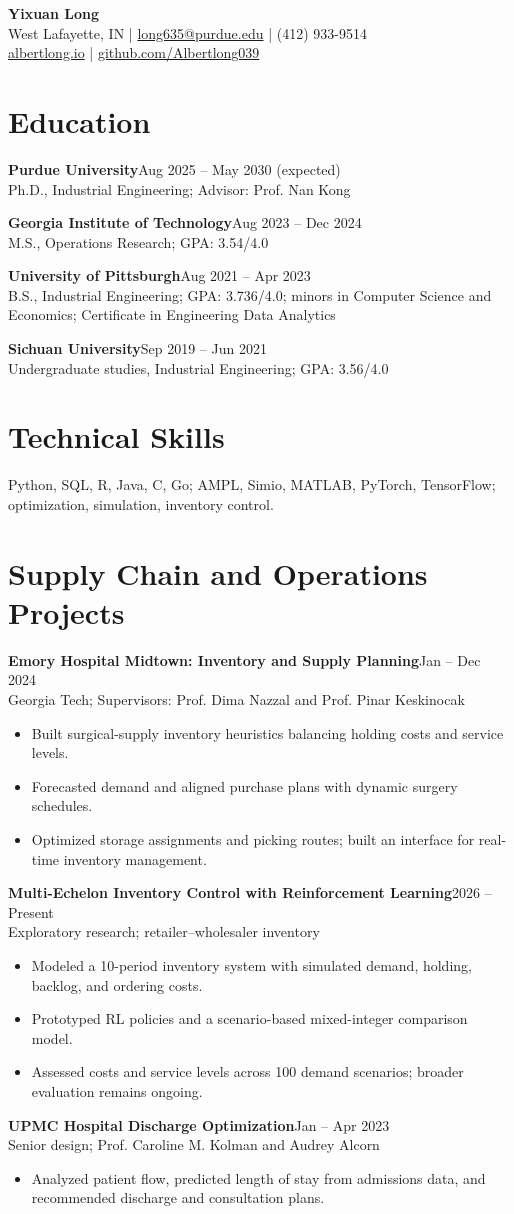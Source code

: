 \documentclass[letterpaper,10pt]{article}
\newcommand{\job}[3]{\textbf{#1}\hfill #2\\{\small #3}\par}
\begin{document}
\begin{center}
{\LARGE\bfseries Yixuan Long}\\
West Lafayette, IN \quad | \quad \href{mailto:long635@purdue.edu}{long635@purdue.edu} \quad | \quad (412) 933-9514\\
\href{https://albertlong.io}{albertlong.io} \quad | \quad \href{https://github.com/Albertlong039}{github.com/Albertlong039}
\end{center}
\section{Education}
\job{Purdue University}{Aug 2025 -- May 2030 (expected)}{Ph.D., Industrial Engineering; Advisor: Prof. Nan Kong}
\job{Georgia Institute of Technology}{Aug 2023 -- Dec 2024}{M.S., Operations Research; GPA: 3.54/4.0}
\job{University of Pittsburgh}{Aug 2021 -- Apr 2023}{B.S., Industrial Engineering; GPA: 3.736/4.0; minors in Computer Science and Economics; Certificate in Engineering Data Analytics}
\job{Sichuan University}{Sep 2019 -- Jun 2021}{Undergraduate studies, Industrial Engineering; GPA: 3.56/4.0}
\section{Technical Skills}
Python, SQL, R, Java, C, Go; AMPL, Simio, MATLAB, PyTorch, TensorFlow; optimization, simulation, inventory control.
\section{Supply Chain and Operations Projects}
\job{Emory Hospital Midtown: Inventory and Supply Planning}{Jan -- Dec 2024}{Georgia Tech; Supervisors: Prof. Dima Nazzal and Prof. Pinar Keskinocak}
\begin{itemize}
\item Built surgical-supply inventory heuristics balancing holding costs and service levels.
\item Forecasted demand and aligned purchase plans with dynamic surgery schedules.
\item Optimized storage assignments and picking routes; built an interface for real-time inventory management.
\end{itemize}
\job{Multi-Echelon Inventory Control with Reinforcement Learning}{2026 -- Present}{Exploratory research; retailer--wholesaler inventory}
\begin{itemize}
\item Modeled a 10-period inventory system with simulated demand, holding, backlog, and ordering costs.
\item Prototyped RL policies and a scenario-based mixed-integer comparison model.
\item Assessed costs and service levels across 100 demand scenarios; broader evaluation remains ongoing.
\end{itemize}
\job{UPMC Hospital Discharge Optimization}{Jan -- Apr 2023}{Senior design; Prof. Caroline M. Kolman and Audrey Alcorn}
\begin{itemize}
\item Analyzed patient flow, predicted length of stay from admissions data, and recommended discharge and consultation plans.
\end{itemize}
\end{document}
